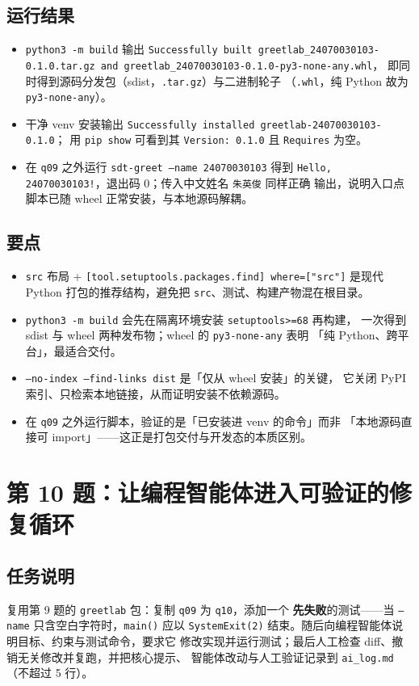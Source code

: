 \documentclass{hamesome-report}
\begin{document}
\subsection{运行结果}
\begin{itemize}
\item \texttt{python3 -m build} 输出
\texttt{Successfully built greetlab\_24070030103-0.1.0.tar.gz and greetlab\_24070030103-0.1.0-py3-none-any.whl}，
即同时得到源码分发包（sdist，\texttt{.tar.gz}）与二进制轮子
（\texttt{.whl}，纯 Python 故为 \texttt{py3-none-any}）。
\item 干净 venv 安装输出 \texttt{Successfully installed greetlab-24070030103-0.1.0}；
用 \texttt{pip show} 可看到其 \texttt{Version: 0.1.0} 且 \texttt{Requires} 为空。
\item 在 \texttt{q09} 之外运行 \texttt{sdt-greet --name 24070030103} 得到
\texttt{Hello, 24070030103!}，退出码 0；传入中文姓名 \texttt{朱英俊} 同样正确
输出，说明入口点脚本已随 wheel 正常安装，与本地源码解耦。
\end{itemize}

\subsection{要点}
\begin{itemize}
\item \texttt{src} 布局 + \texttt{[tool.setuptools.packages.find] where=["src"]}
  是现代 Python 打包的推荐结构，避免把 \texttt{src}、测试、构建产物混在根目录。
\item \texttt{python3 -m build} 会先在隔离环境安装 \texttt{setuptools>=68} 再构建，
  一次得到 sdist 与 wheel 两种发布物；wheel 的 \texttt{py3-none-any} 表明
  「纯 Python、跨平台」，最适合交付。
\item \texttt{--no-index --find-links dist} 是「仅从 wheel 安装」的关键，
  它关闭 PyPI 索引、只检索本地链接，从而证明安装不依赖源码。
\item 在 \texttt{q09} 之外运行脚本，验证的是「已安装进 venv 的命令」而非
  「本地源码直接可 import」——这正是打包交付与开发态的本质区别。
\end{itemize}

\section{第 10 题：让编程智能体进入可验证的修复循环}
\subsection{任务说明}
复用第 9 题的 \texttt{greetlab} 包：复制 \texttt{q09} 为 \texttt{q10}，添加一个
\textbf{先失败}的测试——当 \texttt{--name} 只含空白字符时，\texttt{main()} 应以
\texttt{SystemExit(2)} 结束。随后向编程智能体说明目标、约束与测试命令，要求它
修改实现并运行测试；最后人工检查 diff、撤销无关修改并复跑，并把核心提示、
智能体改动与人工验证记录到 \texttt{ai\_log.md}（不超过 5 行）。
\end{document}
